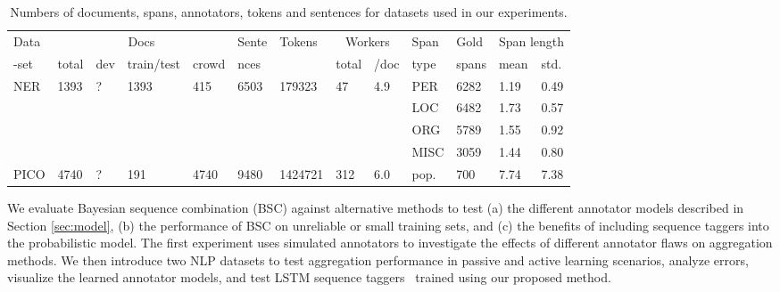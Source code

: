 \begin{table}[h]
\small
\begin{tabularx}{\textwidth}{| X || X | X | X | X | X | l || l | l || X | X | X | X |} \hline
Data & \multicolumn{4}{c|}{Docs} & Sente & Tokens & \multicolumn{2}{c||}{Workers} & Span & Gold & \multicolumn{2}{c|}{Span length}  \\
-set & total & dev & train/test & crowd & nces & & total & /doc & type & spans & mean & std.  \\
\hline
NER & 1393 & ? & 1393 & 415 & 6503 & 179323  & 47 & 4.9 & PER & 6282 & 1.19 & 0.49 \\
&       & & & & & & &  & LOC  & 6482 & 1.73 & 0.57\\
&       & & & & & & & & ORG  & 5789 & 1.55 & 0.92\\
&       & & & & & & & & MISC & 3059 & 1.44 & 0.80\\ \hline
PICO & 4740 & ? & 191 & 4740 & 9480 & 1424721 & 312 & 6.0 & pop. & 700 & 7.74 & 7.38  \\ \hline
\end{tabularx}
\label{tab:datasets}
\caption{Numbers of documents, spans, annotators, tokens and sentences for datasets used in our experiments.}
\end{table}
We evaluate Bayesian sequence combination (BSC) against alternative methods to test 
 (a) the different annotator models described in Section \ref{sec:model},
 (b) the performance of BSC on unreliable or small training sets,
and (c) the benefits of including sequence taggers into the probabilistic model.
The first experiment uses simulated annotators to investigate the effects of different annotator flaws on aggregation methods. 
We then introduce two NLP datasets to 
test aggregation performance in passive and active learning scenarios, 
analyze errors,
visualize the learned annotator models,
and test LSTM 
sequence taggers~\cite{lample2016neural}
trained using our proposed method.


